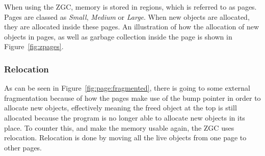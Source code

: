 When using the ZGC, memory is stored in regions, which is referred to as pages. Pages are classed as \textit{Small}, \textit{Medium} or \textit{Large}. When new objects are allocated, they are allocated inside these pages. An illustration of how the allocation of new objects in pages, as well as garbage collection inside the page is shown in Figure~\ref{fig:zpages}.


\subsubsection{Relocation}
As can be seen in Figure~\ref{fig:page:fragmented}, there is going to some external fragmentation because of how the pages make use of the bump pointer in order to allocate new objects, effectively meaning the freed object at the top is still allocated because the program is no longer able to allocate new objects in its place. To counter this, and make the memory usable again, the ZGC uses relocation. Relocation is done by moving all the live objects from one page to other pages.


